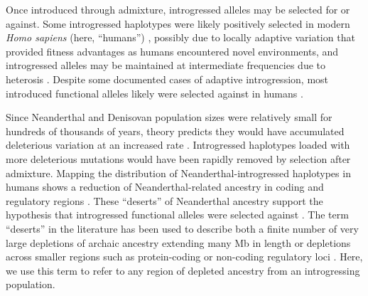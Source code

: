 \documentclass[10pt,letterpaper]{article}
\begin{document}
Once introduced through admixture, introgressed alleles may be selected for or
against. Some introgressed haplotypes were likely positively selected in modern
\emph{Homo sapiens} (here, ``humans'') \cite{huerta2014altitude,
racimo2017signatures, enard2018evidence, gower2021detecting}, possibly due to
locally adaptive variation that provided fitness advantages as humans
encountered novel environments, and introgressed alleles may be maintained at
intermediate frequencies due to heterosis \cite{harris2016genetic}. Despite
some documented cases of adaptive introgression, most introduced functional
alleles likely were selected against in humans \cite{harris2016genetic,
juric2016strength, veller2023recombination}.

Since Neanderthal and Denisovan population sizes were relatively small for
hundreds of thousands of years, theory predicts they would have accumulated
deleterious variation at an increased rate \cite{kimura1963mutation,
lynch1990mutation}. Introgressed haplotypes loaded with more deleterious
mutations would have been rapidly removed by selection after admixture. Mapping
the distribution of Neanderthal-introgressed haplotypes in humans shows a
reduction of Neanderthal-related ancestry in coding and regulatory regions
\cite{petr2019limits, telis2020selection, yermakovich2023long}. These
``deserts'' of Neanderthal ancestry support the hypothesis that introgressed
functional alleles were selected against \cite{sankararaman2014genomic,
vernot2014resurrecting, sankararaman2016combined, vernot2016excavating}. The
term ``deserts'' in the literature has been used to describe both a finite
number of very large depletions of archaic ancestry extending many Mb in length
\cite{sankararaman2014genomic, vernot2014resurrecting,
sankararaman2016combined, vernot2016excavating} or depletions across smaller
regions such as protein-coding or non-coding regulatory loci
\cite{petr2019limits, telis2020selection, yermakovich2023long,
harris2023diverse}. Here, we use this term to refer to any region of depleted
ancestry from an introgressing population.
\end{document}
